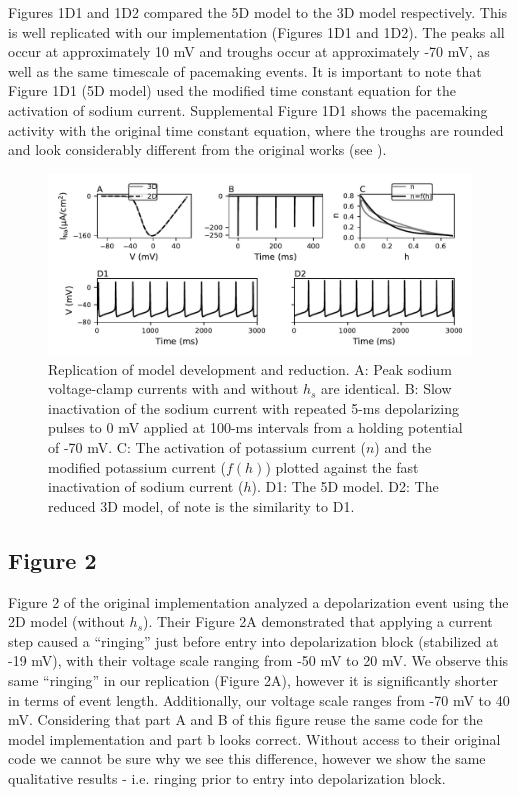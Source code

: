 Figures 1D1 and 1D2 compared the 5D model to the 3D model respectively. This is well replicated with our implementation (Figures 1D1 and 1D2). The peaks all occur at approximately 10 mV and troughs occur at approximately -70 mV, as well as the same timescale of pacemaking events. It is important to note that Figure 1D1 (5D model) used the modified time constant equation for the activation of sodium current. Supplemental Figure 1D1 shows the pacemaking activity with the original time constant equation, where the troughs are rounded and look considerably different from the original works (see ).

\begin{figure}
	\centering
	\includegraphics[scale=0.7]{../figures/figure_1.pdf}
	\caption{Replication of model development and reduction. A: Peak sodium voltage-clamp currents with and without $h_s$ are identical. B: Slow inactivation of the sodium current with repeated 5-ms depolarizing pulses to 0 mV applied at 100-ms intervals from a holding potential of -70 mV. C: The activation of potassium current ($n$) and the modified potassium current ($f(h)$) plotted against the fast inactivation of sodium current ($h$). D1: The 5D model. D2: The reduced 3D model, of note is the similarity to D1.}
	\label{fig:1}
\end{figure}

\subsection{Figure 2}

Figure 2 of the original implementation analyzed a depolarization event using the 2D model (without $h_s$). Their Figure 2A demonstrated that applying a current step caused a ``ringing'' just before entry into depolarization block (stabilized at -19 mV), with their voltage scale ranging from -50 mV to 20 mV. We observe this same ``ringing'' in our replication (Figure 2A), however it is significantly shorter in terms of event length. Additionally, our voltage scale ranges from -70 mV to 40 mV. Considering that part A and B of this figure reuse the same code for the model implementation and part b looks correct. Without access to their original code we cannot be sure why we see this difference, however we show the same qualitative results - i.e. ringing prior to entry into depolarization block.

